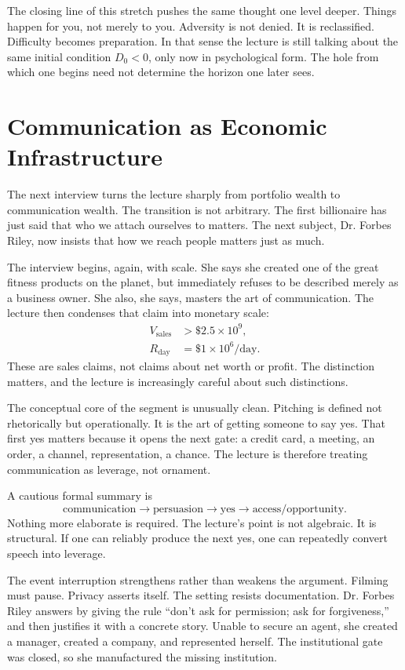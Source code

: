 The closing line of this stretch pushes the same thought one level deeper. Things happen for you, not merely to you. Adversity is not denied. It is reclassified. Difficulty becomes preparation. In that sense the lecture is still talking about the same initial condition \(D_0<0\), only now in psychological form. The hole from which one begins need not determine the horizon one later sees.

\section{Communication as Economic Infrastructure}

The next interview turns the lecture sharply from portfolio wealth to communication wealth. The transition is not arbitrary. The first billionaire has just said that who we attach ourselves to matters. The next subject, Dr. Forbes Riley, now insists that how we reach people matters just as much.

The interview begins, again, with scale. She says she created one of the great fitness products on the planet, but immediately refuses to be described merely as a business owner. She also, she says, masters the art of communication. The lecture then condenses that claim into monetary scale:
\begin{align}
V_{\text{sales}} &> \$2.5 \times 10^9,\\
R_{\text{day}} &= \$1 \times 10^6/\text{day}.
\end{align}
These are sales claims, not claims about net worth or profit. The distinction matters, and the lecture is increasingly careful about such distinctions.

The conceptual core of the segment is unusually clean. Pitching is defined not rhetorically but operationally. It is the art of getting someone to say yes. That first yes matters because it opens the next gate: a credit card, a meeting, an order, a channel, representation, a chance. The lecture is therefore treating communication as leverage, not ornament.

A cautious formal summary is
\begin{equation}
\text{communication} \to \text{persuasion} \to \text{yes} \to \text{access/opportunity}.
\end{equation}
Nothing more elaborate is required. The lecture's point is not algebraic. It is structural. If one can reliably produce the next yes, one can repeatedly convert speech into leverage.

The event interruption strengthens rather than weakens the argument. Filming must pause. Privacy asserts itself. The setting resists documentation. Dr. Forbes Riley answers by giving the rule ``don't ask for permission; ask for forgiveness,'' and then justifies it with a concrete story. Unable to secure an agent, she created a manager, created a company, and represented herself. The institutional gate was closed, so she manufactured the missing institution.

